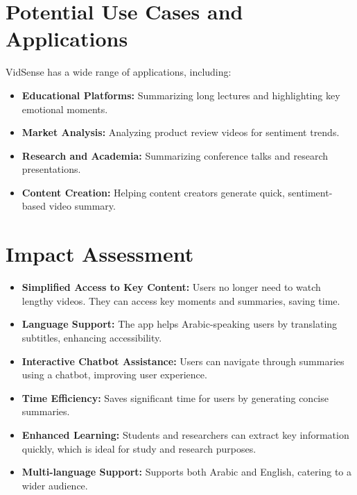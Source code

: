 \documentclass{bscs}
\begin{document}
\chapter{Potential Use Cases and Applications}

VidSense has a wide range of applications, including: 
\begin{itemize}
    \item \textbf{Educational Platforms:} Summarizing long lectures and highlighting key emotional moments.
    \item \textbf{Market Analysis:} Analyzing product review videos for sentiment trends. 
    
    \item \textbf{Research and Academia:} Summarizing conference talks and research presentations.

    \item \textbf{Content Creation:} Helping content creators generate quick, sentiment-based video summary.

    
\end{itemize}

\chapter{Impact Assessment}

\begin{itemize}
    \item \textbf{Simplified Access to Key Content:} Users no longer need to watch lengthy videos. They can access key moments and summaries, saving time.
    
    \item \textbf{Language Support:} The app helps Arabic-speaking users by translating subtitles, enhancing accessibility.
    
    \item \textbf{Interactive Chatbot Assistance:} Users can navigate through summaries using a chatbot, improving user experience.
    
    \item \textbf{Time Efficiency:} Saves significant time for users by generating concise summaries.
    
    \item \textbf{Enhanced Learning:} Students and researchers can extract key information quickly, which is ideal for study and research purposes.
    
    \item \textbf{Multi-language Support:} Supports both Arabic and English, catering to a wider audience.
\end{itemize}
\end{document}

